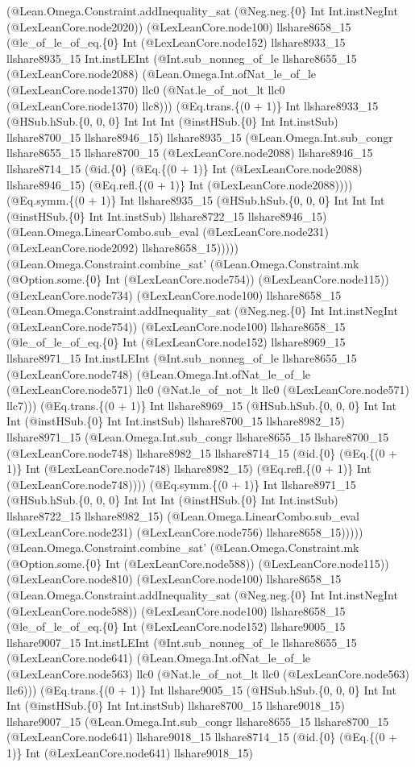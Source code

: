 \documentclass[11pt]{article}
\begin{document}
(@Lean.Omega.Constraint.addInequality\_sat (@Neg.neg.\{0\} Int Int.instNegInt (@LexLeanCore.node2020)) (@LexLeanCore.node100) llshare8658\_15 (@le\_of\_le\_of\_eq.\{0\} Int (@LexLeanCore.node152) llshare8933\_15 llshare8935\_15 Int.instLEInt (@Int.sub\_nonneg\_of\_le llshare8655\_15 (@LexLeanCore.node2088) (@Lean.Omega.Int.ofNat\_le\_of\_le (@LexLeanCore.node1370) llc0 (@Nat.le\_of\_not\_lt llc0 (@LexLeanCore.node1370) llc8))) (@Eq.trans.\{(0 + 1)\} Int llshare8933\_15 (@HSub.hSub.\{0, 0, 0\} Int Int Int (@instHSub.\{0\} Int Int.instSub) llshare8700\_15 llshare8946\_15) llshare8935\_15 (@Lean.Omega.Int.sub\_congr llshare8655\_15 llshare8700\_15 (@LexLeanCore.node2088) llshare8946\_15 llshare8714\_15 (@id.\{0\} (@Eq.\{(0 + 1)\} Int (@LexLeanCore.node2088) llshare8946\_15) (@Eq.refl.\{(0 + 1)\} Int (@LexLeanCore.node2088)))) (@Eq.symm.\{(0 + 1)\} Int llshare8935\_15 (@HSub.hSub.\{0, 0, 0\} Int Int Int (@instHSub.\{0\} Int Int.instSub) llshare8722\_15 llshare8946\_15) (@Lean.Omega.LinearCombo.sub\_eval (@LexLeanCore.node231) (@LexLeanCore.node2092) llshare8658\_15))))) (@Lean.Omega.Constraint.combine\_sat' (@Lean.Omega.Constraint.mk (@Option.some.\{0\} Int (@LexLeanCore.node754)) (@LexLeanCore.node115)) (@LexLeanCore.node734) (@LexLeanCore.node100) llshare8658\_15 (@Lean.Omega.Constraint.addInequality\_sat (@Neg.neg.\{0\} Int Int.instNegInt (@LexLeanCore.node754)) (@LexLeanCore.node100) llshare8658\_15 (@le\_of\_le\_of\_eq.\{0\} Int (@LexLeanCore.node152) llshare8969\_15 llshare8971\_15 Int.instLEInt (@Int.sub\_nonneg\_of\_le llshare8655\_15 (@LexLeanCore.node748) (@Lean.Omega.Int.ofNat\_le\_of\_le (@LexLeanCore.node571) llc0 (@Nat.le\_of\_not\_lt llc0 (@LexLeanCore.node571) llc7))) (@Eq.trans.\{(0 + 1)\} Int llshare8969\_15 (@HSub.hSub.\{0, 0, 0\} Int Int Int (@instHSub.\{0\} Int Int.instSub) llshare8700\_15 llshare8982\_15) llshare8971\_15 (@Lean.Omega.Int.sub\_congr llshare8655\_15 llshare8700\_15 (@LexLeanCore.node748) llshare8982\_15 llshare8714\_15 (@id.\{0\} (@Eq.\{(0 + 1)\} Int (@LexLeanCore.node748) llshare8982\_15) (@Eq.refl.\{(0 + 1)\} Int (@LexLeanCore.node748)))) (@Eq.symm.\{(0 + 1)\} Int llshare8971\_15 (@HSub.hSub.\{0, 0, 0\} Int Int Int (@instHSub.\{0\} Int Int.instSub) llshare8722\_15 llshare8982\_15) (@Lean.Omega.LinearCombo.sub\_eval (@LexLeanCore.node231) (@LexLeanCore.node756) llshare8658\_15))))) (@Lean.Omega.Constraint.combine\_sat' (@Lean.Omega.Constraint.mk (@Option.some.\{0\} Int (@LexLeanCore.node588)) (@LexLeanCore.node115)) (@LexLeanCore.node810) (@LexLeanCore.node100) llshare8658\_15 (@Lean.Omega.Constraint.addInequality\_sat (@Neg.neg.\{0\} Int Int.instNegInt (@LexLeanCore.node588)) (@LexLeanCore.node100) llshare8658\_15 (@le\_of\_le\_of\_eq.\{0\} Int (@LexLeanCore.node152) llshare9005\_15 llshare9007\_15 Int.instLEInt (@Int.sub\_nonneg\_of\_le llshare8655\_15 (@LexLeanCore.node641) (@Lean.Omega.Int.ofNat\_le\_of\_le (@LexLeanCore.node563) llc0 (@Nat.le\_of\_not\_lt llc0 (@LexLeanCore.node563) llc6))) (@Eq.trans.\{(0 + 1)\} Int llshare9005\_15 (@HSub.hSub.\{0, 0, 0\} Int Int Int (@instHSub.\{0\} Int Int.instSub) llshare8700\_15 llshare9018\_15) llshare9007\_15 (@Lean.Omega.Int.sub\_congr llshare8655\_15 llshare8700\_15 (@LexLeanCore.node641) llshare9018\_15 llshare8714\_15 (@id.\{0\} (@Eq.\{(0 + 1)\} Int (@LexLeanCore.node641) llshare9018\_15) 
\end{document}
